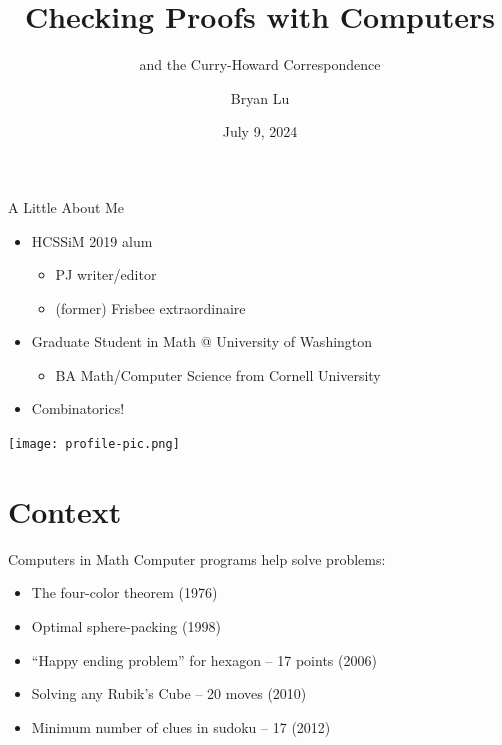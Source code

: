 \documentclass{beamer}
\title{Checking Proofs with Computers}
\subtitle{and the Curry-Howard Correspondence}
\author{Bryan Lu}
\date{July 9, 2024}
\begin{document}
  

	\setcounter{showProgressBar}{0}
	\setcounter{showSlideNumbers}{0}

\frame{\titlepage}

\begin{frame}{A Little About Me}
  \begin{minipage}{0.6\textwidth}
  \begin{itemize}
    \item HCSSiM 2019 alum
      \begin{itemize}
        \item PJ writer/editor
        \item (former) Frisbee extraordinaire
      \end{itemize}
    \item Graduate Student in Math @ University of Washington
      \begin{itemize}
        \item BA Math/Computer Science from Cornell University 
      \end{itemize}
    \item Combinatorics! 
  \end{itemize}  
  \end{minipage}
  \hfill
  \begin{minipage}{0.3\textwidth}
    \texttt{[image: profile-pic.png]} 
  \end{minipage}
\end{frame}

\section{Context}

  \setcounter{framenumber}{0}
	\setcounter{showProgressBar}{1}
	\setcounter{showSlideNumbers}{1}


\begin{frame}{Computers in Math}
  Computer programs help solve problems: 
  \begin{itemize}
    \item The four-color theorem (1976)
    \item Optimal sphere-packing (1998)
    \pause\item ``Happy ending problem'' for hexagon -- 17 points (2006)
    \item Solving any Rubik's Cube -- 20 moves (2010)
    \item Minimum number of clues in sudoku -- 17 (2012)
  \end{itemize} 
\end{frame}
\end{document}
